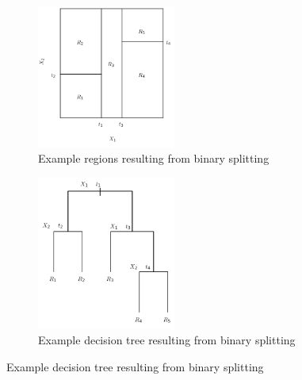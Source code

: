 			\begin{figure}[H]\centering
			    \begin{subfigure}[b]{0.3\textwidth}
			        \includegraphics[width=0.5\textwidth]{sections/Classification/DecisionTrees/BinarySplitting/binarySplittingRegions.png}
			        \caption{Example regions resulting from binary splitting}
			        \label{fig:binarySplittingRegions}
			    \end{subfigure}
			    \hspace{0.5cm}
			    \begin{subfigure}[b]{0.3\textwidth}
			        \includegraphics[width=0.5\textwidth]{sections/Classification/DecisionTrees/BinarySplitting/binarySplittingTree.png}
			        \caption{Example decision tree resulting from binary splitting}
			        \label{fig:binarySplittingTree}
			    \end{subfigure}
			\end{figure}
			
